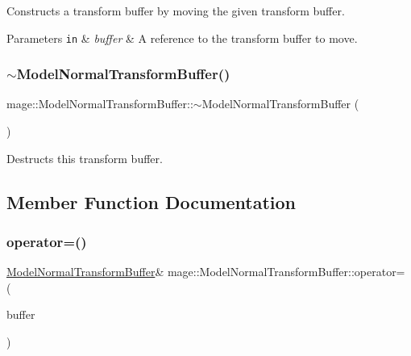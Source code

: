 Constructs a transform buffer by moving the given transform buffer.


\begin{DoxyParams}[1]{Parameters}
\mbox{\tt in}  & {\em buffer} & A reference to the transform buffer to move. \\
\hline
\end{DoxyParams}
\hypertarget{structmage_1_1_model_normal_transform_buffer_a157d1f7cc47463f6b589d25c039ec418}{}\label{structmage_1_1_model_normal_transform_buffer_a157d1f7cc47463f6b589d25c039ec418} 
\subsubsection{\texorpdfstring{$\sim$\+Model\+Normal\+Transform\+Buffer()}{~ModelNormalTransformBuffer()}}
{\footnotesize\ttfamily mage\+::\+Model\+Normal\+Transform\+Buffer\+::$\sim$\+Model\+Normal\+Transform\+Buffer (\begin{DoxyParamCaption}{ }\end{DoxyParamCaption})\hspace{0.3cm}{\ttfamily [default]}}

Destructs this transform buffer. 

\subsection{Member Function Documentation}
\hypertarget{structmage_1_1_model_normal_transform_buffer_ae0b033dc93145a55e5e00024f8f95330}{}\label{structmage_1_1_model_normal_transform_buffer_ae0b033dc93145a55e5e00024f8f95330} 
\subsubsection{\texorpdfstring{operator=()}{operator=()}\hspace{0.1cm}{\footnotesize\ttfamily [1/2]}}
{\footnotesize\ttfamily \hyperlink{structmage_1_1_model_normal_transform_buffer}{Model\+Normal\+Transform\+Buffer}\& mage\+::\+Model\+Normal\+Transform\+Buffer\+::operator= (\begin{DoxyParamCaption}\item[{const \hyperlink{structmage_1_1_model_normal_transform_buffer}{Model\+Normal\+Transform\+Buffer} \&}]{buffer }\end{DoxyParamCaption})\hspace{0.3cm}{\ttfamily [default]}}

